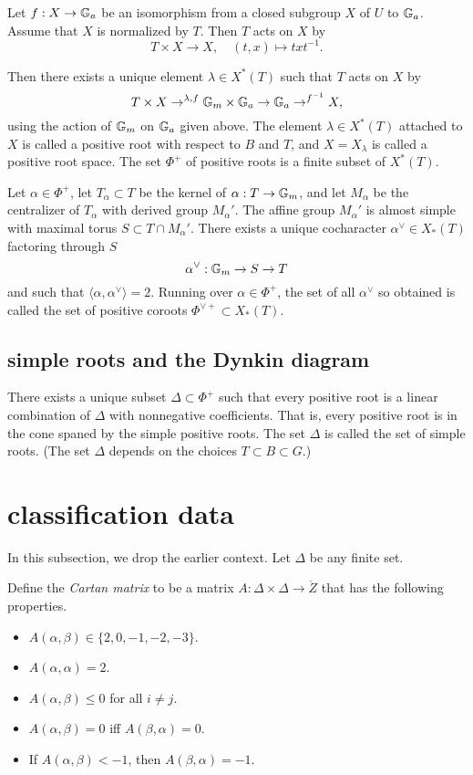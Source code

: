 Let $f:X\to {\Bbb G}_a$ be an isomorphism from a
closed subgroup $X$ of $U$ to ${\Bbb G}_a$.  Assume that $X$ is normalized by
$T$. Then $T$ acts on $X$ by
\[
T \times X \to X,\quad  (t,x) \mapsto t x t^{-1}.
\]

Then there exists a
unique element $\lambda\in X^*(T)$ such that $T$ acts on $X$ by
\[
T\times X\to^{\lambda,f} {\Bbb G}_m \times {\Bbb G}_a
\to {\Bbb G}_a \to^{f^{-1}} X,
\]
using the action of ${\Bbb G}_m$ on ${\Bbb G}_a$ given above.  The element
$\lambda\in X^*(T)$ attached to $X$ is called a positive root with
respect to $B$ and $T$, and $X = X_\lambda$ is called a positive root
space.  The set $\Phi^+$ of positive roots is a finite subset of
$X^*(T)$.

Let $\alpha\in\Phi^+$, let
$T_\alpha\subset T$ be the kernel of $\alpha: T\to {\Bbb G}_m$, and let
$M_\alpha$ be the centralizer of $T_\alpha$ with derived group
$M_\alpha'$.  The affine group $M_\alpha'$ is almost simple with
maximal torus $S \subset T \cap M_\alpha'$.  There exists a unique
cocharacter $\alpha^\vee\in X_*(T)$ factoring through $S$
\[
\alpha^\vee:{\Bbb G}_m\to S \to T
\]
and such that $\langle \alpha,\alpha^\vee\rangle = 2$.  Running over
$\alpha\in \Phi^+$, the set of all $\alpha^\vee$ so obtained is called the
set of positive coroots $\Phi^{\vee+}\subset X_*(T)$.


\subsection{simple roots and the Dynkin diagram}

There exists a unique subset $\Delta\subset \Phi^+$ such that every
positive root is a linear combination of $\Delta$ with nonnegative
coefficients.  That is, every positive root is in the cone spaned by
the simple positive roots.  The set $\Delta$ is called the set of
simple roots.  (The set $\Delta$ depends on the choices $T\subset
B\subset G$.)


\section{classification data}

In this subsection, we drop the earlier context.
Let $\Delta$ be any finite set.


Define the {\it Cartan matrix} to be a matrix $A:\Delta\times \Delta\to\ring{Z}$
that has the following properties.
\begin{itemize}
\item $A(\alpha,\beta)\in \{2,0,-1,-2,-3\}$.
\item $A(\alpha,\alpha)=2$.
\item $A(\alpha,\beta)\le 0$ for all $i\ne j$.
\item $A(\alpha,\beta)=0$ iff $A(\beta,\alpha)=0$.
\item If $A(\alpha,\beta)<-1$, then $A(\beta,\alpha)=-1$.
  \end{itemize}

